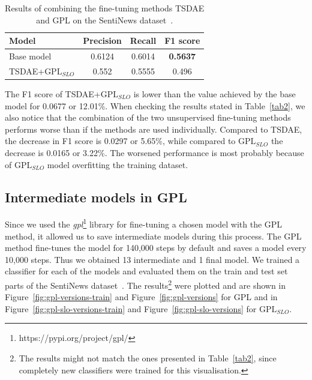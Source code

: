 \documentclass[fleqn,moreauthors,10pt]{ds_report}
\begin{document}
\begin{table}[!h]
	\footnotesize
	\begin{center}
		\begin{tabular}{ |l|c|c|c| }
		\hline
		\rowcolor{Blue}Model & Precision & Recall & F1 score\\
		\hline

		Base model & 0.6124 & 0.6014 & \textbf{0.5637}\\
		TSDAE+$\text{GPL}_{SLO}$ & 0.552 & 0.5555 & 0.496\\

		\hline
		\end{tabular}
	\end{center}
\caption{Results of combining the fine-tuning methods TSDAE and GPL on the SentiNews dataset~\cite{sentiNews}.}
\label{tab3}
\end{table}

The F1 score of TSDAE+$\text{GPL}_{SLO}$ is lower than the value achieved by the base model for 0.0677 or 12.01\%. When checking the results stated in Table~\ref{tab2}, we also notice that the combination of the two unsupervised fine-tuning methods performs worse than if the methods are used individually. Compared to TSDAE, the decrease in F1 score is 0.0297 or 5.65\%, while compared to $\text{GPL}_{SLO}$ the decrease is 0.0165 or 3.22\%. The worsened performance is most probably because of $\text{GPL}_{SLO}$ model overfitting the training dataset.


\subsection*{Intermediate models in GPL}
\label{intermediate-paraphrase}
Since we used the \textit{gpl}\footnote{https://pypi.org/project/gpl/} library for fine-tuning a chosen model with the GPL method, it allowed us to save intermediate models during this process. The GPL method fine-tunes the model for 140,000 steps by default and saves a model every 10,000 steps. Thus we obtained 13 intermediate and 1 final model. We trained a classifier for each of the models and evaluated them on the train and test set parts of the SentiNews dataset~\cite{sentiNews}. The results\footnote{The results might not match the ones presented in Table~\ref{tab2}, since completely new classifiers were trained for this visualisation.} were plotted and are shown in Figure~\ref{fig:gpl-versions-train} and Figure~\ref{fig:gpl-versions} for GPL and in Figure~\ref{fig:gpl-slo-versions-train} and Figure~\ref{fig:gpl-slo-versions} for $\text{GPL}_{SLO}$.
\end{document}
